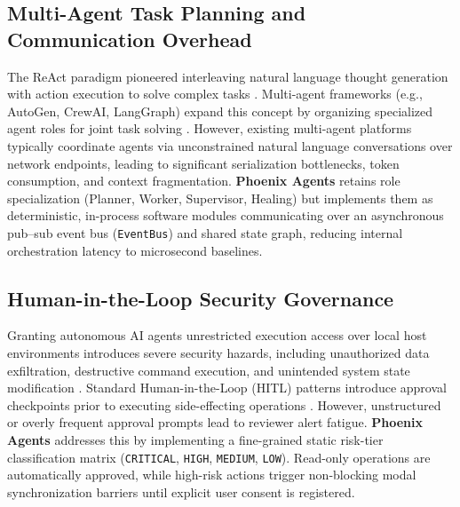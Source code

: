 \documentclass[conference]{IEEEtran}
\begin{document}
\subsection{Multi-Agent Task Planning and Communication Overhead}
The ReAct paradigm pioneered interleaving natural language thought generation with action execution to solve complex tasks \cite{bajoria2026}. Multi-agent frameworks (e.g., AutoGen, CrewAI, LangGraph) expand this concept by organizing specialized agent roles for joint task solving \cite{guo2026, patel2026isiber}. However, existing multi-agent platforms typically coordinate agents via unconstrained natural language conversations over network endpoints, leading to significant serialization bottlenecks, token consumption, and context fragmentation. \textbf{Phoenix Agents} retains role specialization (Planner, Worker, Supervisor, Healing) but implements them as deterministic, in-process software modules communicating over an asynchronous pub--sub event bus (\texttt{EventBus}) and shared state graph, reducing internal orchestration latency to microsecond baselines.

\subsection{Human-in-the-Loop Security Governance}
Granting autonomous AI agents unrestricted execution access over local host environments introduces severe security hazards, including unauthorized data exfiltration, destructive command execution, and unintended system state modification \cite{guo2026}. Standard Human-in-the-Loop (HITL) patterns introduce approval checkpoints prior to executing side-effecting operations \cite{bajoria2026}. However, unstructured or overly frequent approval prompts lead to reviewer alert fatigue. \textbf{Phoenix Agents} addresses this by implementing a fine-grained static risk-tier classification matrix (\texttt{CRITICAL}, \texttt{HIGH}, \texttt{MEDIUM}, \texttt{LOW}). Read-only operations are automatically approved, while high-risk actions trigger non-blocking modal synchronization barriers until explicit user consent is registered.
\end{document}
